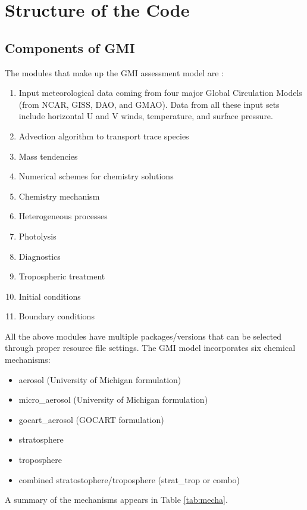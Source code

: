 \chapter[Structure of the Code]{Structure of the Code}
\label{chap:structure}
%
%
%
\section{Components of GMI}
%
The modules that make up the GMI assessment model are \cite{Rotman-etal01}:
%
\begin{enumerate}
\item Input meteorological data coming from four major Global Circulation
      Models (from NCAR, GISS, DAO, and GMAO). Data from all these input
      sets include horizontal U and V winds, temperature, and surface
      pressure.
\item Advection algorithm to transport trace species
\item Mass tendencies
\item Numerical schemes for chemistry solutions
\item Chemistry mechanism
\item Heterogeneous processes
\item Photolysis
\item Diagnostics
\item Tropospheric treatment
\item Initial conditions
\item Boundary conditions
\end{enumerate}
%
All the above modules have multiple packages/versions that can be selected through
proper resource file settings.
The GMI model incorporates six chemical mechanisms:
\begin{itemize}
\item aerosol (University of Michigan formulation)
\item micro\_aerosol (University of Michigan formulation)
\item gocart\_aerosol (GOCART formulation)
\item stratosphere
\item troposphere
\item combined stratostophere/troposphere (strat\_trop or combo)
\end{itemize}
%
A summary of the mechanisms appears in Table \ref{tab:mecha}.
%

